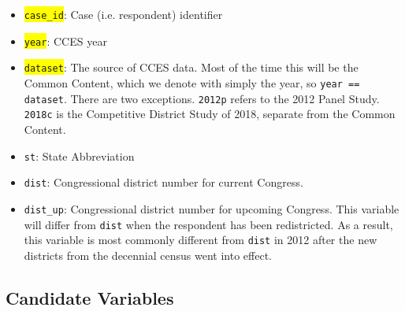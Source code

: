 \documentclass[12pt]{article}
\begin{document}
	
\begin{itemize}
\item \colorbox{yellow}{\texttt{case\_id}}:  Case (i.e. respondent) identifier

\begin{center}

\end{center}

\item  \colorbox{yellow}{\texttt{year}}: CCES year

\item \colorbox{yellow}{\texttt{dataset}}: The source of CCES data. Most of the time this will be the Common Content, which we denote with simply the year, so \texttt{year == dataset}. There are two exceptions. \texttt{2012p} refers to the 2012 Panel Study. \texttt{2018c} is the Competitive District Study of 2018, separate from the Common Content.

\item \texttt{st}: State Abbreviation

\item \texttt{dist}: Congressional district number for current Congress. 

\item \texttt{dist\_up}: Congressional district number for upcoming Congress. This variable will differ from \texttt{dist} when the respondent has been redistricted. As a result, this variable is most commonly different from \texttt{dist} in 2012 after the new districts from the decennial census went into effect. 
\end{itemize}

\subsection{Candidate Variables}
\end{document}
